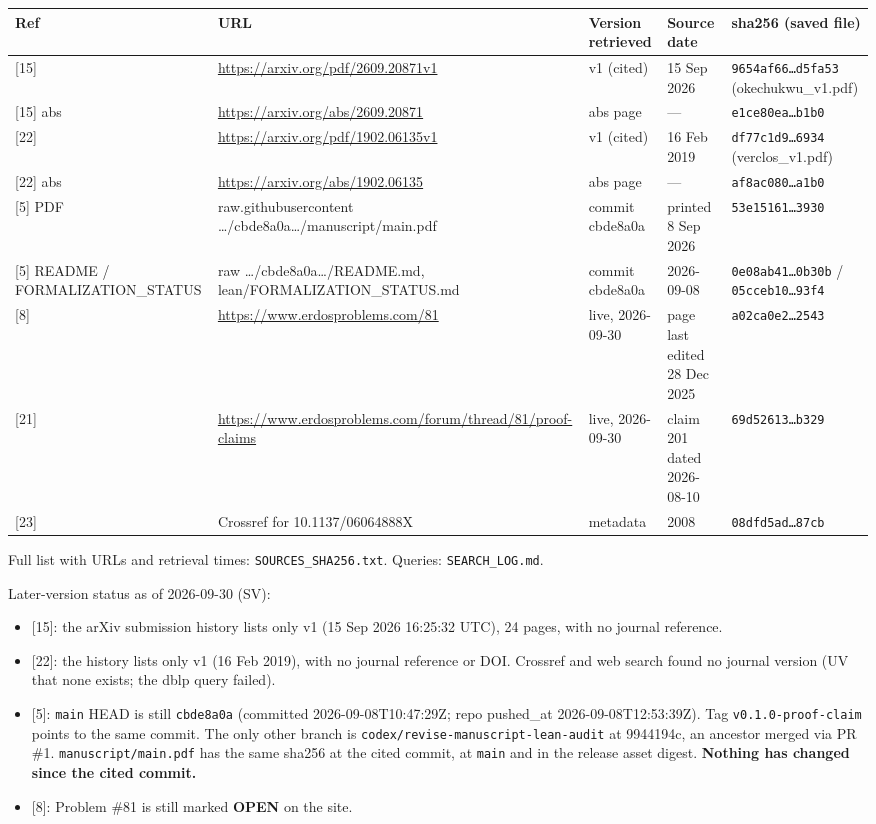 \documentclass[
]{article}
\newcounter{none} %
\providecommand{\tightlist}{%
  \setlength{\itemsep}{0pt}\setlength{\parskip}{0pt}}
\begin{document}
{\def\LTcaptype{none} %
\begin{longtable}[]{@{}lllll@{}}
\toprule\noalign{}
Ref & URL & Version retrieved & Source date & sha256 (saved file) \\
\midrule\noalign{}
\endhead
\bottomrule\noalign{}
\endlastfoot
{[}15{]} & \url{https://arxiv.org/pdf/2609.20871v1} & v1 (cited) & 15
Sep 2026 & \texttt{9654af66…d5fa53} (okechukwu\_v1.pdf) \\
{[}15{]} abs & \url{https://arxiv.org/abs/2609.20871} & abs page & --- &
\texttt{e1ce80ea…b1b0} \\
{[}22{]} & \url{https://arxiv.org/pdf/1902.06135v1} & v1 (cited) & 16
Feb 2019 & \texttt{df77c1d9…6934} (verclos\_v1.pdf) \\
{[}22{]} abs & \url{https://arxiv.org/abs/1902.06135} & abs page & --- &
\texttt{af8ac080…a1b0} \\
{[}5{]} PDF & raw.githubusercontent
\ldots/cbde8a0a\ldots/manuscript/main.pdf & commit cbde8a0a & printed 8
Sep 2026 & \texttt{53e15161…3930} \\
{[}5{]} README / FORMALIZATION\_STATUS & raw
\ldots/cbde8a0a\ldots/README.md, lean/FORMALIZATION\_STATUS.md & commit
cbde8a0a & 2026-09-08 & \texttt{0e08ab41…0b30b} /
\texttt{05cceb10…93f4} \\
{[}8{]} & \url{https://www.erdosproblems.com/81} & live, 2026-09-30 &
page last edited 28 Dec 2025 & \texttt{a02ca0e2…2543} \\
{[}21{]} &
\url{https://www.erdosproblems.com/forum/thread/81/proof-claims} & live,
2026-09-30 & claim 201 dated 2026-08-10 & \texttt{69d52613…b329} \\
{[}23{]} & Crossref for 10.1137/06064888X & metadata & 2008 &
\texttt{08dfd5ad…87cb} \\
\end{longtable}
}

Full list with URLs and retrieval times: \texttt{SOURCES\_SHA256.txt}.
Queries: \texttt{SEARCH\_LOG.md}.

Later-version status as of 2026-09-30 (SV):

\begin{itemize}
\tightlist
\item
  {[}15{]}: the arXiv submission history lists only v1 (15 Sep 2026
  16:25:32 UTC), 24 pages, with no journal reference.
\item
  {[}22{]}: the history lists only v1 (16 Feb 2019), with no journal
  reference or DOI. Crossref and web search found no journal version (UV
  that none exists; the dblp query failed).
\item
  {[}5{]}: \texttt{main} HEAD is still \texttt{cbde8a0a} (committed
  2026-09-08T10:47:29Z; repo pushed\_at 2026-09-08T12:53:39Z). Tag
  \texttt{v0.1.0-proof-claim} points to the same commit. The only other
  branch is \texttt{codex/revise-manuscript-lean-audit} at 9944194c, an
  ancestor merged via PR \#1. \texttt{manuscript/main.pdf} has the same
  sha256 at the cited commit, at \texttt{main} and in the release asset
  digest. \textbf{Nothing has changed since the cited commit.}
\item
  {[}8{]}: Problem \#81 is still marked \textbf{OPEN} on the site.
\end{itemize}
\end{document}
